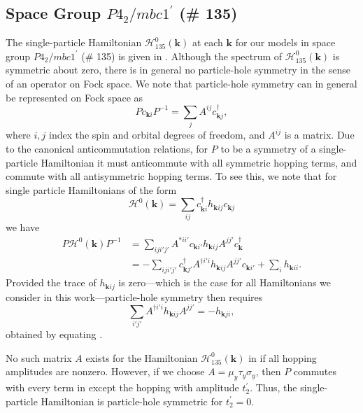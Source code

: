 \documentclass[prb,aps,amssymb,twocolumn,notitlepage]{revtex4-2}
\begin{document}
\subsection{Space Group $P4_2/mbc1^\prime$ (\# 135)}\label{subsec:ph135}
The single-particle Hamiltonian $\mathcal{H}_{135}^{0}(\mathbf{k})$ at each $\mathbf{k}$ for our models in space group $P4_2/mbc1^\prime$ (\# 135) is given in . 
Although the spectrum of $\mathcal{H}_{135}^{0}(\mathbf{k})$ is symmetric about zero, there is in general no particle-hole symmetry in the sense of an operator on Fock space. 
We note that particle-hole symmetry can in general be represented on Fock space as
\begin{equation}\label{eq:phgeneral}
Pc_{\mathbf{k}i}P^{-1} = \sum_j A^{ij}c^\dag_{\mathbf{k}j},
\end{equation}
where $i,j$ index the spin and orbital degrees of freedom, and $A^{ij}$ is a matrix. 
Due to the canonical anticommutation relations, for $P$ to be a symmetry of a single-particle Hamiltonian it must anticommute with all symmetric hopping terms, and commute with all antisymmetric hopping terms. 
To see this, we note that for single particle Hamiltonians of the form
\begin{equation}
\mathcal{H}^0(\mathbf{k}) = \sum_{ij}c^\dag_{\mathbf{k}i}h_{\mathbf{k}ij}c_{\mathbf{k}j}\label{eq:generalspham}
\end{equation}
we have
\begin{align}
P\mathcal{H}^0(\mathbf{k})P^{-1} &= \sum_{iji'j'} A^{*ii'}c_{\mathbf{k}i'}h_{\mathbf{k}ij}A^{jj'}c^\dag_{\mathbf{k}} \\
&= -\sum_{iji'j'}c^\dag_{\mathbf{k}j'}A^{\dag i'i} h_{\mathbf{k}ij}A^{jj'}c_{\mathbf{k}i'} + \sum_i h_{\mathbf{k}ii}.\label{eq:spph}
\end{align}
Provided the trace of $h_{\mathbf{k}ij}$ is zero---which is the case for all Hamiltonians we consider in this work---particle-hole symmetry then requires
\begin{equation}
\sum_{i'j'} A^{\dag i'i} h_{\mathbf{k}ij}A^{jj'} = -h_{\mathbf{k}ji},
\end{equation}
obtained by equating .

No such matrix $A$ exists for the Hamiltonian $\mathcal{H}_{135}^{0}(\mathbf{k})$ in  if all hopping amplitudes are nonzero. 
However, if we choose $A=\mu_y\tau_y\sigma_y$, then $P$ commutes with every term in  except the hopping with amplitude $t_2^\prime$. 
Thus, the single-particle Hamiltonian is particle-hole symmetric for $t_2^\prime=0$.
\end{document}
